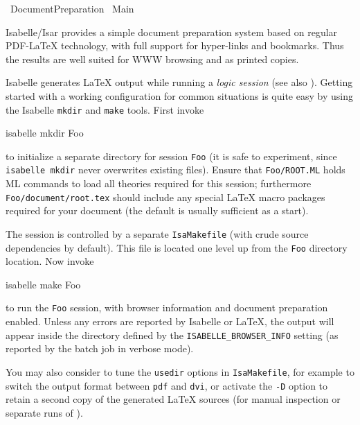 %
\begin{isabellebody}%
\def\isabellecontext{Document{\isacharunderscore}Preparation}%
%
\isadelimtheory
%
\endisadelimtheory
%
\isatagtheory
{}\isamarkupfalse%
\ Document{\isacharunderscore}Preparation\isanewline
{}\ Main\isanewline
{}%
\endisatagtheory
{\isafoldtheory}%
%
\isadelimtheory
%
\endisadelimtheory
%
\isamarkuptrue%
%
\begin{isamarkuptext}%
Isabelle/Isar provides a simple document preparation system
  based on regular {PDF-\LaTeX} technology, with full support for
  hyper-links and bookmarks.  Thus the results are well suited for WWW
  browsing and as printed copies.

  \medskip Isabelle generates {\LaTeX} output while running a
  \emph{logic session} (see also \cite{isabelle-sys}).  Getting
  started with a working configuration for common situations is quite
  easy by using the Isabelle \verb|mkdir| and \verb|make|
  tools.  First invoke
\begin{ttbox}
  isabelle mkdir Foo
\end{ttbox}
  to initialize a separate directory for session \verb|Foo| (it
  is safe to experiment, since \verb|isabelle mkdir| never
  overwrites existing files).  Ensure that \verb|Foo/ROOT.ML|
  holds ML commands to load all theories required for this session;
  furthermore \verb|Foo/document/root.tex| should include any
  special {\LaTeX} macro packages required for your document (the
  default is usually sufficient as a start).

  The session is controlled by a separate \verb|IsaMakefile|
  (with crude source dependencies by default).  This file is located
  one level up from the \verb|Foo| directory location.  Now
  invoke
\begin{ttbox}
  isabelle make Foo
\end{ttbox}
  to run the \verb|Foo| session, with browser information and
  document preparation enabled.  Unless any errors are reported by
  Isabelle or {\LaTeX}, the output will appear inside the directory
  defined by the \verb|ISABELLE_BROWSER_INFO| setting (as
  reported by the batch job in verbose mode).

  \medskip You may also consider to tune the \verb|usedir|
  options in \verb|IsaMakefile|, for example to switch the output
  format between \verb|pdf| and \verb|dvi|, or activate the
  \verb|-D| option to retain a second copy of the generated
  {\LaTeX} sources (for manual inspection or separate runs of
  \hyperlink{executable.latex}{\mbox{}}).


\end{isamarkuptext}
\end{isabellebody}

